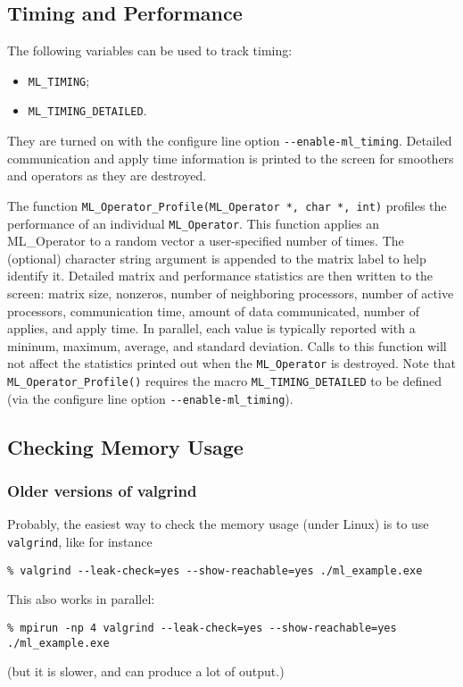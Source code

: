\documentclass[10pt,letter,relax]{SANDreport}
\begin{document}
\subsection{Timing and Performance}

The following variables can be used to track timing:
\begin{itemize}
\item \verb!ML_TIMING!;
\item \verb!ML_TIMING_DETAILED!.
\end{itemize}
They are turned on with the configure line option \verb!--enable-ml_timing!.
Detailed communication and apply time information is printed to the screen for smoothers
and operators as they are destroyed.

The function
\verb!ML_Operator_Profile(ML_Operator *, char *, int)!
profiles the performance of an individual \verb!ML_Operator!.
This function applies an ML\_Operator to a random vector
a user-specified number of times.
The (optional) character string argument is appended to the matrix label to help identify
it.
Detailed matrix and performance statistics are then written to the screen:
matrix size, nonzeros, number of neighboring processors, number of active
processors, communication time, amount of data communicated, number of applies, and apply
time.
In parallel, each value is typically reported with a mininum, maximum, average, and
standard deviation.
Calls to this function will not affect the statistics printed out when the
\verb!ML_Operator! is destroyed.
Note that \verb!ML_Operator_Profile()! requires the macro \verb!ML_TIMING_DETAILED! to be
defined (via the configure line option \verb!--enable-ml_timing!).

\subsection{Checking Memory Usage}

\subsubsection{Older versions of valgrind}
Probably, the easiest way to check the memory usage (under Linux) is to use
\verb!valgrind!, like for instance
\begin{verbatim}
% valgrind --leak-check=yes --show-reachable=yes ./ml_example.exe
\end{verbatim}
This also works in parallel:
\begin{verbatim}
% mpirun -np 4 valgrind --leak-check=yes --show-reachable=yes ./ml_example.exe
\end{verbatim}
(but it is slower, and can produce a lot of output.)
\end{document}
